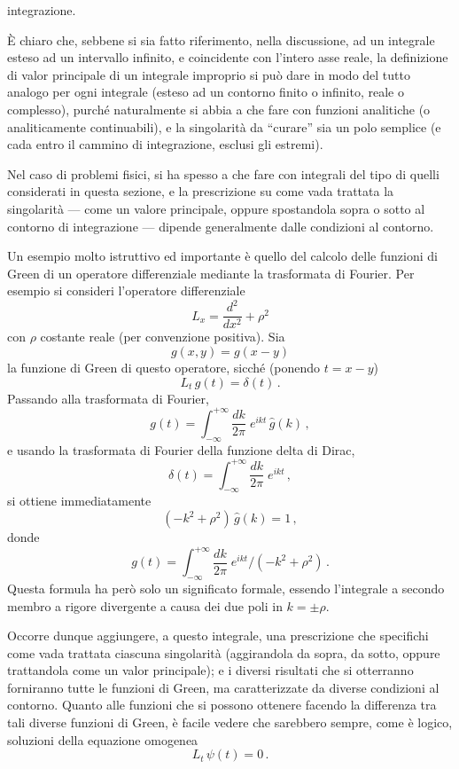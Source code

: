 \documentclass[11pt, a4paper]{book}
\numberwithin{equation}{section}
\begin{document}
integrazione.

È chiaro che, sebbene si sia fatto riferimento, nella discussione, ad un integrale esteso ad un intervallo infinito, e coincidente con l'intero asse reale, la definizione di valor principale di un integrale improprio si può dare in modo del tutto analogo per ogni integrale (esteso ad un contorno finito o infinito, reale o complesso), purché naturalmente si abbia a che fare con funzioni analitiche (o analiticamente continuabili), e la singolarità da ``curare'' sia un polo semplice (e cada entro il cammino di integrazione, esclusi gli estremi).

Nel caso di problemi fisici, si ha spesso a che fare con integrali del tipo di quelli considerati in questa sezione, e la prescrizione su come vada trattata la singolarità — come un valore principale, oppure spostandola sopra o sotto al contorno di integrazione — dipende generalmente dalle condizioni al contorno.

Un esempio molto istruttivo ed importante è quello del calcolo delle funzioni di Green di un operatore differenziale mediante la trasformata di Fourier. Per esempio si consideri l'operatore differenziale
\[
L_x = \frac{d^2}{dx^2} + \rho^2
\]
con $\rho$ costante reale (per convenzione positiva). Sia
\[
g(x,y) = g(x-y)
\]
la funzione di Green di questo operatore, sicché (ponendo $t = x-y$)
\[
L_t\, g(t) = \delta(t)\,.
\]
Passando alla trasformata di Fourier,
\[
g(t) = \int_{-\infty}^{+\infty} \frac{dk}{2\pi}\; e^{ikt}\,\hat{g}(k)\,,
\]
e usando la trasformata di Fourier della funzione delta di Dirac,
\[
\delta(t) = \int_{-\infty}^{+\infty} \frac{dk}{2\pi}\; e^{ikt}\,,
\]
si ottiene immediatamente
\[
(-k^2 + \rho^2)\,\hat{g}(k) = 1\,,
\]
donde
\[
g(t) = \int_{-\infty}^{+\infty} \frac{dk}{2\pi}\; e^{ikt} \big/ (-k^2+\rho^2)\,.
\]
Questa formula ha però solo un significato formale, essendo l'integrale a secondo membro a rigore divergente a causa dei due poli in $k = \pm\rho$.

Occorre dunque aggiungere, a questo integrale, una prescrizione che specifichi come vada trattata ciascuna singolarità (aggirandola da sopra, da sotto, oppure trattandola come un valor principale); e i diversi risultati che si otterranno forniranno tutte le funzioni di Green, ma caratterizzate da diverse condizioni al contorno. Quanto alle funzioni che si possono ottenere facendo la differenza tra tali diverse funzioni di Green, è facile vedere che sarebbero sempre, come è logico, soluzioni della equazione omogenea
\[
L_t\,\psi(t) = 0\,.
\]
\end{document}
